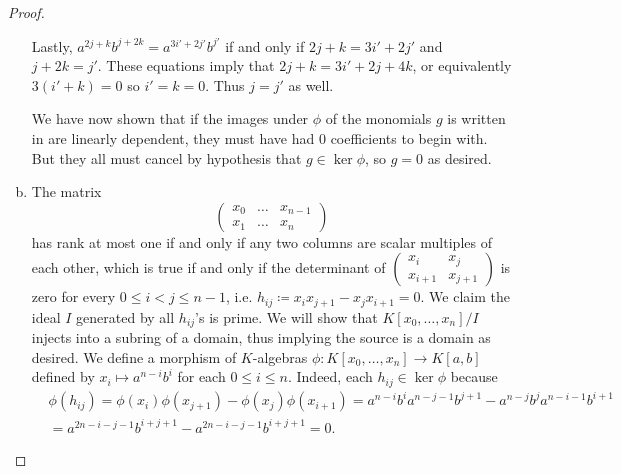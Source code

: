 \documentclass{article}
\begin{document}
\begin{proof}
\begin{enumerate}[(a)]
        \vspace{0.1in}
        Lastly, $a^{2j+k}b^{j+2k}=a^{3i'+2j'} b^{j'}$ if and only if $2j+k=3i'+2j'$ and $j+2k=j'$. These equations imply that $2j+k=3i'+2j+4k$, or equivalently $3(i'+k)=0$ so $i'=k=0$. Thus $j=j'$ as well.

        \vspace{0.1in}
        We have now shown that if the images under $\phi$ of the monomials $g$ is written in are linearly dependent, they must have had $0$ coefficients to begin with. But they all must cancel by hypothesis that $g\in \ker \phi$, so $g=0$ as desired.
        \item The matrix 
        \[
        \begin{pmatrix}
            x_0 & \dots & x_{n-1}\\
            x_1 & \dots & x_{n}
        \end{pmatrix}
        \]
        has rank at most one if and only if any two columns are scalar multiples of each other, which is true if and only if the determinant of $\begin{pmatrix}
            x_i & x_{j}\\
            x_{i+1} & x_{j+1}
        \end{pmatrix}$
        is zero for every $0\le i<j \le n-1$, i.e. $h_{ij} \coloneqq x_i x_{j+1}- x_j x_{i+1}=0$. We claim the ideal $I$ generated by all $h_{ij}$'s is prime. We will show that $K[x_0,\dots, x_n]/I$ injects into a subring of a domain, thus implying the source is a domain as desired. We define a morphism of $K$-algebras $\phi:K[x_0,\dots,x_{n}]\to K[a,b]$ defined by $x_i \mapsto a^{n-i} b^{i}$ for each $0\le i\le n$. Indeed, each $h_{ij}\in \ker \phi$ because \begin{align*}
            &\phi(h_{ij})=\phi(x_i) \phi(x_{j+1}) - \phi(x_j) \phi(x_{i+1}) = a^{n-i} b^i a^{n-j-1} b^{j+1} - a^{n-j} b^j a^{n-i-1} b^{i+1}\\
            &=a^{2n-i-j-1} b^{i+j+1}- a^{2n-i-j-1} b^{i+j+1}=0.
        \end{align*}

\end{enumerate}
\end{proof}
\end{document}

